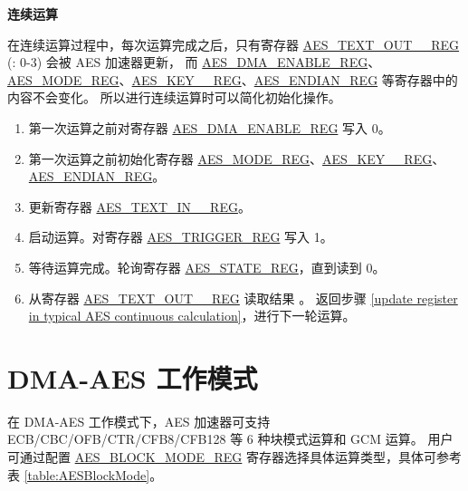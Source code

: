 \documentclass[main\_\_CN.tex]{subfiles}
\begin{document}
\textbf{连续运算}

在连续运算过程中，每次运算完成之后，只有寄存器 \hyperref[regdesc:AESTEXTOUTnREG]{AES\_TEXT\_OUT\_\_REG} (: 0-3) 会被 AES 加速器更新，
而 \hyperref[regdesc:AESDMAENABLEREG]{AES\_DMA\_ENABLE\_REG}、\hyperref[regdesc:AESMODEREG]{AES\_MODE\_REG}、\hyperref[regdesc:AESKEYnREG]{AES\_KEY\_\_REG}、\hyperref[regdesc:AESENDIANREG]{AES\_ENDIAN\_REG} 等寄存器中的内容不会变化。
所以进行连续运算时可以简化初始化操作。

\begin{enumerate}
    \item 第一次运算之前对寄存器 \hyperref[regdesc:AESDMAENABLEREG]{AES\_DMA\_ENABLE\_REG} 写入 0。
    \item 第一次运算之前初始化寄存器 \hyperref[regdesc:AESMODEREG]{AES\_MODE\_REG}、\hyperref[regdesc:AESKEYnREG]{AES\_KEY\_\_REG}、\hyperref[regdesc:AESENDIANREG]{AES\_ENDIAN\_REG}。
    \item 更新寄存器 \hyperref[regdesc:AESTEXTINnREG]{AES\_TEXT\_IN\_\_REG}。 \label{update register in typical AES continuous calculation}
    \item 启动运算。对寄存器 \hyperref[regdesc:AESTRIGGERREG]{AES\_TRIGGER\_REG} 写入 1。
    \item 等待运算完成。轮询寄存器 \hyperref[regdesc:AESSTATEREG]{AES\_STATE\_REG}，直到读到 0。
    \item 从寄存器 \hyperref[regdesc:AESTEXTOUTnREG]{AES\_TEXT\_OUT\_\_REG} 读取结果 \label{read result in typical AES continuous calculation}。 返回步骤 \ref{update register in typical AES continuous calculation}，进行下一轮运算。
\end{enumerate}


\section{DMA-AES 工作模式}\label{subsection:dma-aes}

在 DMA-AES 工作模式下，AES 加速器可支持 ECB/CBC/OFB/CTR/CFB8/CFB128 等 6 种块模式运算和 GCM 运算。
用户可通过配置 \hyperref[regdesc:AESBLOCKMODEREG]{AES\_BLOCK\_MODE\_REG} 寄存器选择具体运算类型，具体可参考表 \ref{table:AESBlockMode}。
\end{document}
